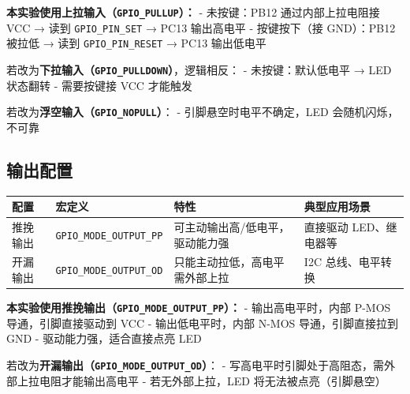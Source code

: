 \documentclass[
  chinese,
  UTF8,
  oneside,
  openany]{ctexbook}
\begin{document}
\textbf{本实验使用上拉输入（\texttt{GPIO\_PULLUP}）：} - 未按键：PB12
通过内部上拉电阻接 VCC → 读到 \texttt{GPIO\_PIN\_SET} → PC13 输出高电平
- 按键按下（接 GND）：PB12 被拉低 → 读到 \texttt{GPIO\_PIN\_RESET} →
PC13 输出低电平

若改为\textbf{下拉输入（\texttt{GPIO\_PULLDOWN}）}，逻辑相反： -
未按键：默认低电平 → LED 状态翻转 - 需要按键接 VCC 才能触发

若改为\textbf{浮空输入（\texttt{GPIO\_NOPULL}）}： -
引脚悬空时电平不确定，LED 会随机闪烁，不可靠

\subsection{输出配置}\label{ux8f93ux51faux914dux7f6e}

\begin{longtable}[]{@{}
  >{\raggedright\arraybackslash}p{}
  >{\raggedright\arraybackslash}p{}
  >{\raggedright\arraybackslash}p{}
  >{\raggedright\arraybackslash}p{}@{}}
\toprule\noalign{}
\begin{minipage}[b]{\linewidth}\raggedright
配置
\end{minipage} & \begin{minipage}[b]{\linewidth}\raggedright
宏定义
\end{minipage} & \begin{minipage}[b]{\linewidth}\raggedright
特性
\end{minipage} & \begin{minipage}[b]{\linewidth}\raggedright
典型应用场景
\end{minipage} \\
\midrule\noalign{}
\endhead
\bottomrule\noalign{}
\endlastfoot
推挽输出 & \texttt{GPIO\_MODE\_OUTPUT\_PP} &
可主动输出高/低电平，驱动能力强 & 直接驱动 LED、继电器等 \\
开漏输出 & \texttt{GPIO\_MODE\_OUTPUT\_OD} &
只能主动拉低，高电平需外部上拉 & I2C 总线、电平转换 \\
\end{longtable}

\textbf{本实验使用推挽输出（\texttt{GPIO\_MODE\_OUTPUT\_PP}）：} -
输出高电平时，内部 P-MOS 导通，引脚直接驱动到 VCC - 输出低电平时，内部
N-MOS 导通，引脚直接拉到 GND - 驱动能力强，适合直接点亮 LED

若改为\textbf{开漏输出（\texttt{GPIO\_MODE\_OUTPUT\_OD}）}： -
写高电平时引脚处于高阻态，需外部上拉电阻才能输出高电平 -
若无外部上拉，LED 将无法被点亮（引脚悬空）
\end{document}
